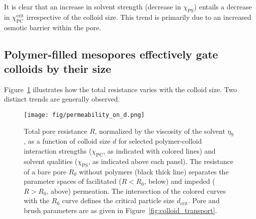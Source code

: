 \documentclass[12pt, a4paper]{article}
\begin{document}
It is clear that an increase in solvent strength (decrease in $\chi_{\text{PS}}$) entails a decrease in $\chi_{\text{PC}}^{\text{crit}}$ irrespective of the colloid size. This trend is primarily due to an increased osmotic barrier within the pore.




\subsection{Polymer-filled mesopores effectively gate colloids by their size}

Figure~\ref{fig:R_vs_d} illustrates how the total resistance varies with the colloid size. 
Two distinct trends are generally observed.

\begin{figure}
    \centering
    \texttt{[image: fig/permeability\_on\_d.png]}
    \caption{
    Total pore resistance $R$, normalized by the viscosity of the solvent $\eta_\text{S}$, as a function of colloid size $d$ for selected polymer-colloid interaction strengths ($\chi_{\text{PC}}$, as indicated with colored lines) and solvent qualities ($\chi_{\text{PS}}$, as indicated above each panel). 
    The resistance of a bare pore $R_{0}$ without polymers (black thick line) separates the parameter spaces of facilitated ($R < R_{0}$, below) and impeded ($R > R_{0}$, above) permeation.
    The intersection of the colored curves with the $R_{0}$ curve defines the critical particle size $d_{\text{crit}}$.
    Pore and brush parameters are as given in Figure~\ref{fig:colloid_transport}. 
    }
    \label{fig:R_vs_d}
\end{figure}
\end{document}
